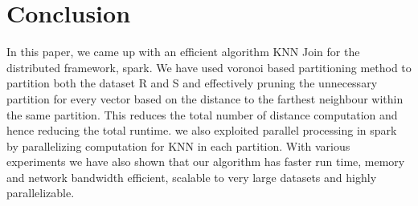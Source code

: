 \chapter{Conclusion} \label{chap:conclusion}

In this paper, we came up with an efficient algorithm KNN Join for the
distributed framework, spark. We have used voronoi based partitioning
method to partition both the dataset R and S and effectively pruning
the unnecessary partition for every vector based on the distance to
the farthest neighbour within the same partition. This reduces the
total number of distance computation and hence reducing the total runtime.
we also exploited parallel processing in spark by parallelizing
computation for KNN in each partition. With various experiments we
have also shown that our algorithm has faster run time, memory and
network bandwidth efficient, scalable to very large datasets and
highly parallelizable.
